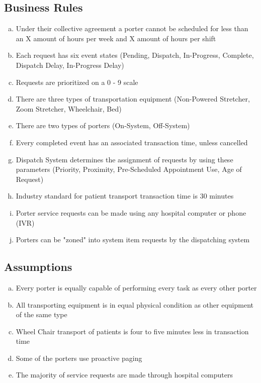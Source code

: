 \documentclass[paper=letter, fontsize=10pt]{scrartcl}
\numberwithin{equation}{section}		%
\numberwithin{figure}{section}			%
\numberwithin{table}{section}				%
\begin{document}
\subsection{Business Rules}
\begin{enumerate}[(a)]
	\item Under their collective agreement a porter cannot be scheduled for less than an X amount of hours per week and X amount of hours per shift 
	\item Each request has six event states (Pending, Dispatch, In-Progress, Complete, Dispatch Delay, In-Progress Delay)
	\item Requests are prioritized on a 0 - 9 scale
	\item There are three types of transportation equipment (Non-Powered Stretcher, Zoom Stretcher, Wheelchair, Bed)
	\item There are two types of porters (On-System, Off-System)
	\item Every completed event has an associated transaction time, unless cancelled
	\item Dispatch System determines the assignment of requests by using these parameters (Priority, Proximity, Pre-Scheduled Appointment Use, Age of Request) 
	\item Industry standard for patient transport transaction time is 30 minutes
	\item Porter service requests can be made using any hospital computer or phone (IVR)
	\item Porters can be "zoned" into system item requests by the dispatching system  
\end{enumerate}	    
\subsection{Assumptions}
\begin{enumerate}[(a)]
	\item Every porter is equally capable of performing every task as every other porter
	\item All transporting equipment is in equal physical condition as other equipment of the same type
	\item Wheel Chair transport of patients is four to five minutes less in transaction time
	\item Some of the porters use proactive paging  
	\item The majority of service requests are made through hospital computers
\end{enumerate}
\end{document}
